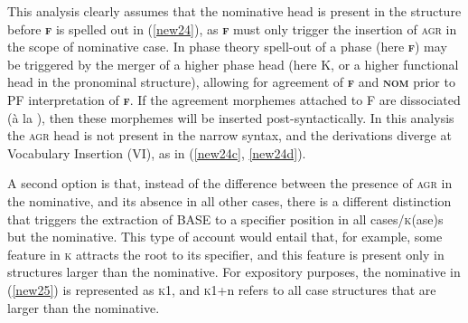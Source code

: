 \documentclass[output=paper,colorlinks,citecolor=brown,
]{langscibook}
\begin{document}
This analysis clearly assumes that the nominative head is present in the structure before \textsc{\textbf{f}} is spelled out in (\ref{new24}), as \textsc{\textbf{f}} must only trigger the insertion of \textsc{agr} in the scope of nominative case. In phase theory spell-out of a phase (here \textsc{\textbf{f}}) may be triggered by the merger of a higher phase head (here K, or a higher functional head in the pronominal structure), allowing for agreement of \textsc{\textbf{f}} and \textsc{\textbf{nom}} prior to PF interpretation of \textsc{\textbf{f}}. If the agreement morphemes attached to F are dissociated (à la \citealt{Embick1997}), then these morphemes will be inserted post-syntactically. In this analysis the \textsc{agr} head is not present in the narrow syntax, and the derivations diverge at Vocabulary Insertion (VI), as in (\ref{new24c}, \ref{new24d}). 

A second option is that, instead of the difference between the presence of \textsc{agr} in the nominative, and its absence in all other cases, there is a different distinction that triggers the extraction of BASE to a specifier position in all cases/\textsc{k}(ase)s but the nominative. This type of account would entail that, for example, some feature in \textsc{k} attracts the root to its specifier, and this feature is present only in structures larger than the nominative. For expository purposes, the nominative in (\ref{new25})  is represented as \textsc{k}1, and \textsc{k}1+n refers to all case structures that are larger than the nominative.
\end{document}
